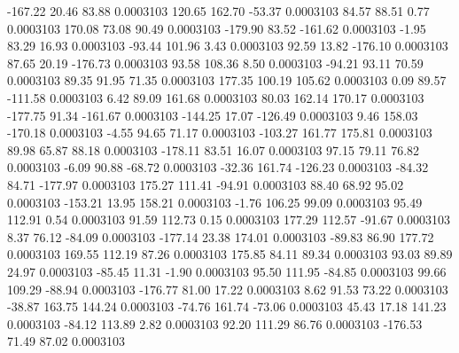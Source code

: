      -167.22       20.46       83.88     0.0003103
      120.65      162.70      -53.37     0.0003103
       84.57       88.51        0.77     0.0003103
      170.08       73.08       90.49     0.0003103
     -179.90       83.52     -161.62     0.0003103
       -1.95       83.29       16.93     0.0003103
      -93.44      101.96        3.43     0.0003103
       92.59       13.82     -176.10     0.0003103
       87.65       20.19     -176.73     0.0003103
       93.58      108.36        8.50     0.0003103
      -94.21       93.11       70.59     0.0003103
       89.35       91.95       71.35     0.0003103
      177.35      100.19      105.62     0.0003103
        0.09       89.57     -111.58     0.0003103
        6.42       89.09      161.68     0.0003103
       80.03      162.14      170.17     0.0003103
     -177.75       91.34     -161.67     0.0003103
     -144.25       17.07     -126.49     0.0003103
        9.46      158.03     -170.18     0.0003103
       -4.55       94.65       71.17     0.0003103
     -103.27      161.77      175.81     0.0003103
       89.98       65.87       88.18     0.0003103
     -178.11       83.51       16.07     0.0003103
       97.15       79.11       76.82     0.0003103
       -6.09       90.88      -68.72     0.0003103
      -32.36      161.74     -126.23     0.0003103
      -84.32       84.71     -177.97     0.0003103
      175.27      111.41      -94.91     0.0003103
       88.40       68.92       95.02     0.0003103
     -153.21       13.95      158.21     0.0003103
       -1.76      106.25       99.09     0.0003103
       95.49      112.91        0.54     0.0003103
       91.59      112.73        0.15     0.0003103
      177.29      112.57      -91.67     0.0003103
        8.37       76.12      -84.09     0.0003103
     -177.14       23.38      174.01     0.0003103
      -89.83       86.90      177.72     0.0003103
      169.55      112.19       87.26     0.0003103
      175.85       84.11       89.34     0.0003103
       93.03       89.89       24.97     0.0003103
      -85.45       11.31       -1.90     0.0003103
       95.50      111.95      -84.85     0.0003103
       99.66      109.29      -88.94     0.0003103
     -176.77       81.00       17.22     0.0003103
        8.62       91.53       73.22     0.0003103
      -38.87      163.75      144.24     0.0003103
      -74.76      161.74      -73.06     0.0003103
       45.43       17.18      141.23     0.0003103
      -84.12      113.89        2.82     0.0003103
       92.20      111.29       86.76     0.0003103
     -176.53       71.49       87.02     0.0003103

